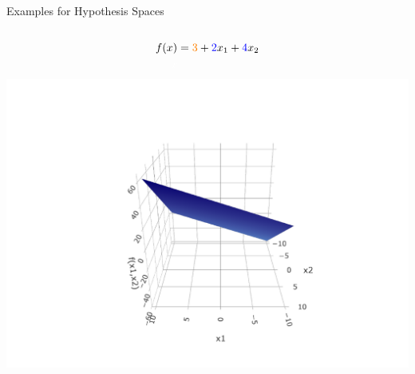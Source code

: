 \documentclass[11pt,compress,t,notes=noshow, xcolor=table]{beamer}
\begin{document}
\begin{vbframe}{Examples for Hypothesis Spaces}
\vspace*{-\baselineskip}

\begin{columns}

  \tiny

  \begin{column}{0.33\textwidth}
    \begin{center}
      \begin{equation*}
        \begin{split}
          f(x) &= \textcolor{orange}{3} + \textcolor{blue}{2} x_1 + 
          \textcolor{blue}{4} x_2 \\
          \textcolor{white}{x} 
        \end{split}
      \end{equation*}
      \includegraphics[width=1.2\textwidth]{figure/hs-quadric-1.pdf}
    \end{center}
  \end{column}
  

\end{columns}
\end{vbframe}
\end{document}
